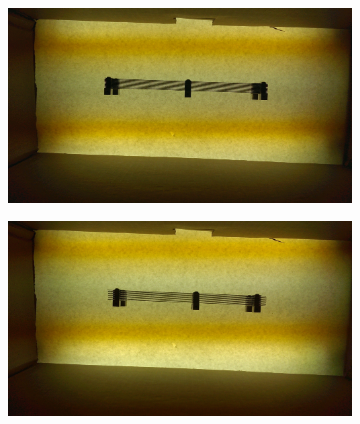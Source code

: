 \documentclass[10pt]{scrartcl}
\begin{document}
\begin{figure}[!ht]
    \centering
    \hspace{-1.0in}
    \begin{subfigure}[b]{.45\linewidth}
        \centering
        \includegraphics[width=1.3\textwidth]{../plots_tables_images/slats/IMAG0116.jpg}
        \caption{}
    \end{subfigure}
    \hspace{.5in}
    \begin{subfigure}[b]{.45\linewidth}
        \centering
        \includegraphics[width=1.3\textwidth]{../plots_tables_images/slats/IMAG0120.jpg}
        \caption{}
    \end{subfigure}


\end{figure}
\end{document}
